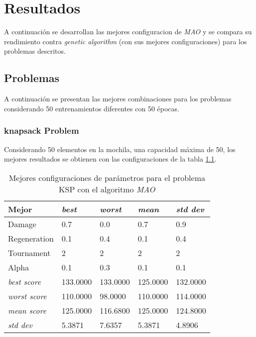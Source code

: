\chapter{Resultados}

A continuación se desarrollan las mejores configuracion de \textit{MAO} y se compara su rendimiento contra \textit{genetic algorithm} (con sus mejores configuraciones) para los problemas descritos.

\section{Problemas}

A continuación se presentan las mejores combinaciones para los problemas considerando 50 entrenamientos diferentes con 50 épocas.

\subsection{knapsack Problem}

Considerando 50 elementos en la mochila, una capacidad máxima de 50, los mejores resultados se obtienen con las configuraciones de la tabla \ref{tab:res_ksp}.


\begin{table}[h!]
	\centering
	\begin{tabular}{|p{}|p{}|p{}|p{}|p{}|}
		\hline
		\textbf{Mejor} & \textbf{\textit{best}} & \textbf{\textit{worst}} & \textbf{\textit{mean}} & \textbf{\textit{std dev}}  \\ \hline
		
		Damage & 0.7 & 0.0 & 0.7 & 0.9 \\
		Regeneration & 0.1 & 0.4 & 0.1 & 0.4 \\
		Tournament & 2 & 2 & 2 & 2 \\
		Alpha & 0.1 & 0.3 & 0.1 & 0.1 \\ \hline
		
		\textit{best score} & 133.0000 & 133.0000 & 125.0000 & 132.0000 \\
		\textit{worst score} & 110.0000 & 98.0000 & 110.0000 & 114.0000 \\
		\textit{mean score} & 125.0000 & 116.6800 & 125.0000 & 124.8000 \\
		\textit{std dev} & 5.3871 & 7.6357 & 5.3871 & 4.8906 \\ \hline
	\end{tabular}
	\caption{Mejores configuraciones de parámetros para el problema KSP con el algoritmo \textit{MAO}}
	\label{tab:res_ksp}
\end{table}

